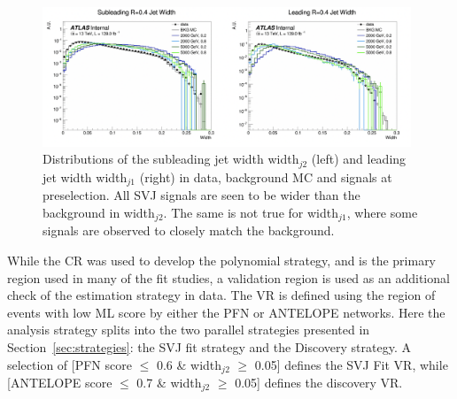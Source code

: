 \begin{figure}[!htbp]
\centering
   \includegraphics[width=0.98\textwidth]{figures/background/jet2Width}
    \caption{Distributions of the subleading jet width width$_{j2}$ (left) and leading jet width width$_{j1}$ (right) in data, background MC and signals at preselection. All SVJ signals are seen to be wider than the background in width$_{j2}$. The same is not true for width$_{j1}$, where some signals are observed to closely match the background. 
    \label{fig:jet2width}}
\end{figure}

While the CR was used to develop the polynomial strategy, and is the primary region used in many of the fit studies, a validation region is used as an additional check of the estimation strategy in data.
The VR is defined using the region of events with low ML score by either the PFN or ANTELOPE networks.
Here the analysis strategy splits into the two parallel strategies presented in Section~\ref{sec:strategies}: the SVJ fit strategy and the Discovery strategy.
A selection of [PFN score $\leq$ 0.6 \& width$_{j2}$ $\geq$ 0.05] defines the SVJ Fit VR, while [ANTELOPE score $\leq$ 0.7 \& width$_{j2}$ $\geq$ 0.05] defines the discovery VR. 

